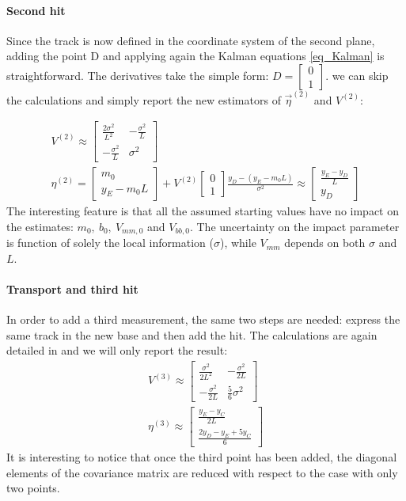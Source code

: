 \documentclass[12pt,a4paper,openright, oneside, titlepage]{book} %
\begin{document}
\paragraph{Second hit} 
Since the track is now defined in the coordinate system of the second plane, 
adding the point D and applying again the Kalman equations \ref{eq_Kalman} is straightforward. 
The derivatives take the simple form: $D=\begin{bmatrix}0\\1\end{bmatrix}$. 
we can skip the calculations and simply report the new estimators  of $\vec{\eta}^{(2)}$ and  $V^{(2)}$:

\begin{equation}
\begin{gathered}
V^{(2)}\approx
\begin{bmatrix}
\frac{2\sigma^2}{L^2} & -\frac{\sigma^2}{L} \\
-\frac{\sigma^2}{L} & \sigma^2
\end{bmatrix}\\
\eta^{(2)} = 
\begin{bmatrix} m_0 \\  y_E-m_0L \end{bmatrix} +
V^{(2)}
\begin{bmatrix} 0\\1 \end{bmatrix}
\frac{y_D-(y_E-m_0L)}{\sigma^2} \approx
\begin{bmatrix} \frac{y_E-y_D}{L} \\ y_D\end{bmatrix}
\end{gathered}
\label{eq_V2}
\end{equation}
The interesting feature is that all the assumed starting values have no impact on the estimates: $m_0,\ b_0,\ V_{mm,0}$ and $V_{bb,0}$. 
The uncertainty on the impact parameter is function of solely the local information ($\sigma$), 
while $V_{mm}$ depends on both $\sigma$ and $L$. 

\paragraph{Transport and third hit} 
In order to add a third measurement, 
the same two steps are needed: 
express the same track in the new base and then add the hit. 
The calculations are again detailed in \cite{KutschkePaper} and we will only report the result:
\begin{gather*}
V^{(3)}\approx
\begin{bmatrix}
\frac{\sigma^2}{2L^2} & -\frac{\sigma^2}{2L} \\
-\frac{\sigma^2}{2L} & \frac{5}{6}\sigma^2
\end{bmatrix}\\
\eta^{(3)} \approx
\begin{bmatrix} \frac{y_E-y_C}{2L} \\ \frac{2y_D-y_E+5y_C}{6}
\end{bmatrix}
\end{gather*}
It is interesting to notice that once the third point has been added, 
the diagonal elements of the covariance matrix are reduced with respect to the case with only two points. 
\end{document}
